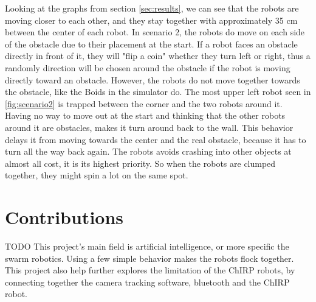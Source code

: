 Looking at the graphs from section \ref{sec:results}, we can see that the robots are moving closer to each other, and they stay together with approximately 35 cm between the center of each robot. In scenario 2, the robots do move on each side of the obstacle due to their placement at the start. If a robot faces an obstacle directly in front of it, they will "flip a coin" whether they turn left or right, thus a randomly direction will be chosen around the obstacle if the robot is moving directly toward an obstacle.
However, the robots do not move together towards the obstacle, like the Boids in the simulator do. The most upper left robot seen in \ref{fig:scenario2} is trapped between the corner and the two robots around it. Having no way to move out at the start and thinking that the other robots around it are obstacles, makes it turn around back to the wall. This behavior delays it from moving towards the center and the real obstacle, because it has to turn all the way back again.
The robots avoids crashing into other objects at almost all cost, it is its highest priority. So when the robots are clumped together, they might spin a lot on the same spot.






\section{Contributions}
\label{sec:Contributions}
TODO
This project's main field is artificial intelligence, or more specific the swarm robotics. Using a few simple behavior makes the robots flock together.
This project also help further explores the limitation of the ChIRP robots, by connecting together the camera tracking software, bluetooth and the ChIRP robot.

